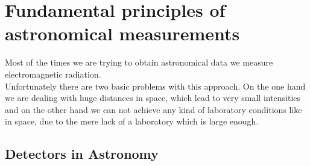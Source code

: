\chapter{Fundamental principles of astronomical measurements}
Most of the times we are trying to obtain astronomical data we measure electromagnetic radiation. \\
Unfortunately there are two basic problems with this approach. On the one hand we are dealing with huge distances in space, which lead to very small intensities and on the other hand we can not achieve any kind of laboratory conditions like in space, due to the mere lack of a laboratory which is large enough.

\section{Detectors in Astronomy}

